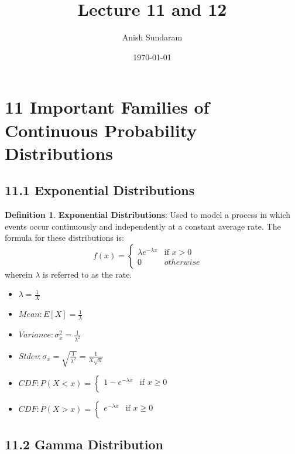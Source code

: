 \documentclass[12pt]{amsart}
\title{Lecture 11 and 12}
\author{Anish Sundaram}
\date{\today}
\theoremstyle{definition}
\newtheorem{definition}{Definition} %
\numberwithin{equation}{theorem}    %
\begin{document}
\maketitle

\tableofcontents

\section*{11 Important Families of Continuous Probability Distributions}
\subsection*{11.1 Exponential Distributions}

\begin{definition}
    \textbf{Exponential Distributions}:
    Used to model a process in which events occur continuously and independently at a constant average rate. The formula for these distributions is:
    $$f(x) = \begin{cases}
        \lambda e ^{-\lambda x}  & \text{if } x > 0 \\
        0  & otherwise
  \end{cases} \quad$$
  wherein $\lambda$ is referred to as the rate.
  \begin{itemize}
    \item $\lambda = \frac{1}{X}$
    \item $Mean:E[X] = \frac{1}{\lambda}$
    \item $Variance: \sigma_x^2 = \frac{1}{\lambda^2}$
    \item $Stdev: \sigma_x = \sqrt{\frac{1}{\lambda^2}} = \frac{1}{X\sqrt{n}}$
    \item $CDF: P(X < x) = \begin{cases}
        1-e ^{-\lambda x}  & \text{if } x \geq 0 \\
    \end{cases} \quad$
    \item $CDF: P(X > x) = \begin{cases}
        e ^{-\lambda x}  & \text{if } x \geq 0 \\
    \end{cases} \quad$
\end{itemize}
\end{definition}



\subsection*{11.2 Gamma Distribution}
\end{document}
